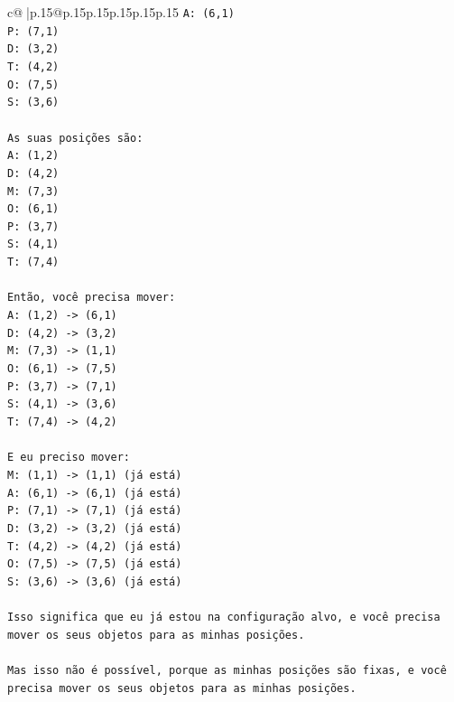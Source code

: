 \documentclass{article}
\begin{document}
{\begin{supertabular}{c@{$\;$}|p{.15\linewidth}@{}p{.15\linewidth}p{.15\linewidth}p{.15\linewidth}p{.15\linewidth}p{.15\linewidth}}
{{{\texttt{A: (6,1)} \\
\texttt{P: (7,1)} \\
\texttt{D: (3,2)} \\
\texttt{T: (4,2)} \\
\texttt{O: (7,5)} \\
\texttt{S: (3,6)} \\
\\ 
\texttt{As suas posições são:} \\
\texttt{A: (1,2)} \\
\texttt{D: (4,2)} \\
\texttt{M: (7,3)} \\
\texttt{O: (6,1)} \\
\texttt{P: (3,7)} \\
\texttt{S: (4,1)} \\
\texttt{T: (7,4)} \\
\\ 
\texttt{Então, você precisa mover:} \\
\texttt{A: (1,2) {-}> (6,1)} \\
\texttt{D: (4,2) {-}> (3,2)} \\
\texttt{M: (7,3) {-}> (1,1)} \\
\texttt{O: (6,1) {-}> (7,5)} \\
\texttt{P: (3,7) {-}> (7,1)} \\
\texttt{S: (4,1) {-}> (3,6)} \\
\texttt{T: (7,4) {-}> (4,2)} \\
\\ 
\texttt{E eu preciso mover:} \\
\texttt{M: (1,1) {-}> (1,1) (já está)} \\
\texttt{A: (6,1) {-}> (6,1) (já está)} \\
\texttt{P: (7,1) {-}> (7,1) (já está)} \\
\texttt{D: (3,2) {-}> (3,2) (já está)} \\
\texttt{T: (4,2) {-}> (4,2) (já está)} \\
\texttt{O: (7,5) {-}> (7,5) (já está)} \\
\texttt{S: (3,6) {-}> (3,6) (já está)} \\
\\ 
\texttt{Isso significa que eu já estou na configuração alvo, e você precisa mover os seus objetos para as minhas posições.} \\
\\ 
\texttt{Mas isso não é possível, porque as minhas posições são fixas, e você precisa mover os seus objetos para as minhas posições.} \\
}}}
\end{supertabular}}
\end{document}
